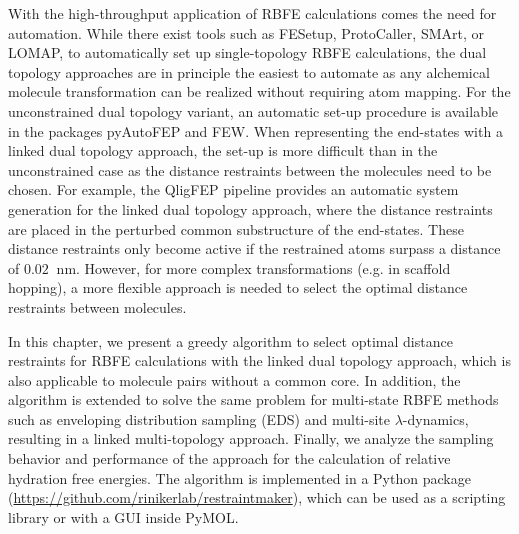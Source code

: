 With the high-throughput application of RBFE calculations comes the need for automation.\cite{Christ2014} While there exist tools such as FESetup,\cite{Loeffler2015} ProtoCaller,\cite{Suruzhon2020} SMArt,\cite{Petrov2021} or LOMAP,\cite{Liu2013} to automatically set up single-topology RBFE calculations, the dual topology approaches are in principle the easiest to automate as any alchemical molecule transformation can be realized without requiring atom mapping.\cite{Rocklin2013}
For the unconstrained dual topology variant, an automatic set-up procedure is available in the packages pyAutoFEP\cite{Carvalho2021} and FEW\cite{Homeyer2013}.
When representing the end-states with a linked dual topology approach, the set-up is more difficult than in the unconstrained case as the distance restraints between the molecules need to be chosen.
For example, the QligFEP pipeline\cite{Jespers2019} provides an automatic system generation for the linked dual topology approach, where the distance restraints are placed in the perturbed common substructure of the end-states. These distance restraints only become active if the restrained atoms surpass a distance of $0.02~$ nm.
However, for more complex transformations (e.g. in scaffold hopping), a more flexible approach is needed to select the optimal distance restraints between molecules.

In this chapter, we present a greedy algorithm to select optimal distance restraints for RBFE calculations with the linked dual topology approach, which is also applicable to molecule pairs without a common core. In addition, the algorithm is extended to solve the same problem for multi-state RBFE methods such as enveloping distribution sampling (EDS)\cite{Christ2007,Christ2008} and multi-site $\lambda$-dynamics,\cite{Knight2011} resulting in a linked multi-topology approach. Finally, we analyze the sampling behavior and performance of the approach for the calculation of relative hydration free energies. The algorithm is implemented in a Python package (\url{https://github.com/rinikerlab/restraintmaker}), which can be used as a scripting library or with a GUI inside PyMOL. \cite{Delano2020}

